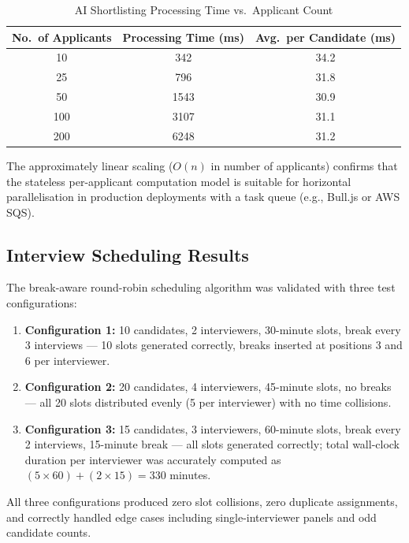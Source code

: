 \documentclass[12pt,a4paper]{report}
\begin{document}
\begin{table}[H]
    \centering
    \caption{AI Shortlisting Processing Time vs.\ Applicant Count}
    \label{tab:perf}
    \begin{tabular}{|c|c|c|}
        \hline
        \textbf{No.\ of Applicants} & \textbf{Processing Time (ms)} & \textbf{Avg.\ per Candidate (ms)} \\
        \hline
        10  & 342  & 34.2 \\
        25  & 796  & 31.8 \\
        50  & 1543 & 30.9 \\
        100 & 3107 & 31.1 \\
        200 & 6248 & 31.2 \\
        \hline
    \end{tabular}
\end{table}

The approximately linear scaling ($O(n)$ in number of applicants) confirms that the stateless per-applicant computation model is suitable for horizontal parallelisation in production deployments with a task queue (e.g., Bull.js or AWS SQS).

\subsection{Interview Scheduling Results}

The break-aware round-robin scheduling algorithm was validated with three test configurations:
\begin{enumerate}[leftmargin=*, label=\arabic*., itemsep=2pt]
    \item \textbf{Configuration 1:} 10 candidates, 2 interviewers, 30-minute slots, break every 3 interviews --- 10 slots generated correctly, breaks inserted at positions 3 and 6 per interviewer.
    \item \textbf{Configuration 2:} 20 candidates, 4 interviewers, 45-minute slots, no breaks --- all 20 slots distributed evenly (5 per interviewer) with no time collisions.
    \item \textbf{Configuration 3:} 15 candidates, 3 interviewers, 60-minute slots, break every 2 interviews, 15-minute break --- all slots generated correctly; total wall-clock duration per interviewer was accurately computed as $(5 \times 60) + (2 \times 15) = 330$ minutes.
\end{enumerate}

All three configurations produced zero slot collisions, zero duplicate assignments, and correctly handled edge cases including single-interviewer panels and odd candidate counts.
\end{document}

